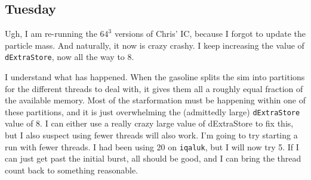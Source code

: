 \documentclass[11pt,letterpaper]{article}
\begin{document}
\subsection*{Tuesday}
Ugh, I am re-running the $64^3$ versions of Chris' IC, because I forgot to 
update the particle mass. And naturally, it now is crazy crashy.  I keep 
increasing the value of \verb!dExtraStore!, now all the way to 8.

I understand what has happened.  When the gasoline splits the sim into 
partitions for the different threads to deal with, it gives them all a roughly
equal fraction of the available memory.  Most of the starformation must be 
happening within one of these partitions, and it is just overwhelming the
(admittedly large) \verb!dExtraStore! value of 8.  I can either use a really
crazy large value of dExtraStore to fix this, but I also suspect using  fewer
threads will also work.  I'm going to try starting a run with fewer threads.
I had been using 20 on \verb!iqaluk!, but I will now try 5.  If I can 
just get past the initial burst, all should be good, and I can bring the 
thread count back to something reasonable.
\end{document}
